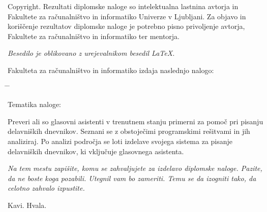 \documentclass[a4paper, 12pt]{book}
\newcommand{\clearemptydoublepage}{\newpage{\pagestyle{empty}\cleardoublepage}}
\begin{document}
\noindent
{\sc Copyright}. 
Rezultati diplomske naloge so intelektualna lastnina avtorja in Fakultete za računalništvo in informatiko Univerze v Ljubljani.
Za objavo in koriščenje rezultatov diplomske naloge je potrebno pisno privoljenje avtorja, Fakultete za računalništvo in informatiko ter mentorja.

\begin{center}
\mbox{}\vfill
\emph{Besedilo je oblikovano z urejevalnikom besedil \LaTeX.}
\end{center}
\clearemptydoublepage

\thispagestyle{empty}
\vspace*{4cm}

\noindent
Fakulteta za računalništvo in informatiko izdaja naslednjo nalogo:
\medskip
\begin{tabbing}
\hspace{32mm}\= \hspace{6cm} \= \kill




Tematika naloge:
\end{tabbing}
Preveri ali so glasovni asistenti v trenutnem stanju primerni za pomoč pri pisanju delavniških dnevnikov.
Seznani se z obstoječimi programskimi rešitvami in jih analiziraj.
Po analizi področja se loti izdelave svojega sistema za pisanje delavniških dnevnikov, ki vključuje glasovnega asistenta.
\vspace{15mm}



\vspace{2cm}

\clearemptydoublepage

\thispagestyle{empty}\mbox{}\vfill\null\it%
\noindent
Na tem mestu zapišite, komu se zahvaljujete za izdelavo diplomske naloge. Pazite, da ne boste koga pozabili. Utegnil vam bo zameriti. Temu se da izogniti tako, da celotno zahvalo izpustite.
\rm\normalfont

\clearemptydoublepage

\thispagestyle{empty}\mbox{}{\textheight}\mbox{}\hfill\begin{minipage}{0.55\textwidth}%
	Kavi. Hvala.
\normalfont\end{minipage}
\end{document}

